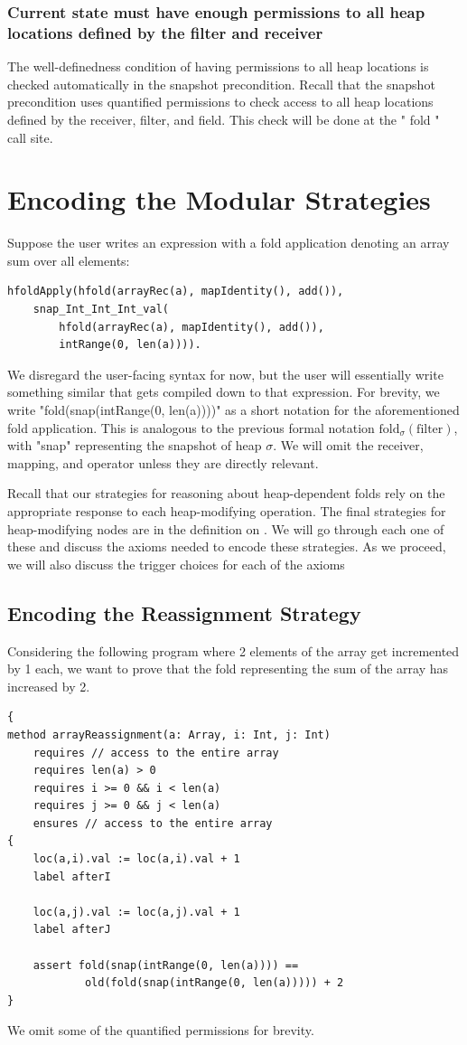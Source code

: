 \documentclass[msc,oneside]{ubcthesis}
\theoremstyle{definition}
\begin{document}
\subsubsection{Current state must have enough permissions to all heap locations defined by the filter and receiver}
The well-definedness condition of having permissions to all heap locations is checked automatically in the snapshot precondition. Recall that the snapshot precondition uses quantified permissions to check access to all heap locations defined by the receiver, filter, and field. This check will be done at the " fold " call site.

\section{Encoding the Modular Strategies}
Suppose the user writes an expression with a fold application denoting an array sum over all elements: 
\begin{lstlisting}
hfoldApply(hfold(arrayRec(a), mapIdentity(), add()),
    snap_Int_Int_Int_val(
        hfold(arrayRec(a), mapIdentity(), add()), 
        intRange(0, len(a)))).
\end{lstlisting}
We disregard the user-facing syntax for now, but the user will essentially write something similar that gets compiled down to that expression. For brevity, we write "fold(snap(intRange(0, len(a))))" as a short notation for the aforementioned fold application. This is analogous to the previous formal notation $\textrm{fold}_\sigma(\textrm{filter})$, with "snap" representing the snapshot of heap $\sigma$.  We will omit the receiver, mapping, and operator unless they are directly relevant. 

Recall that our strategies for reasoning about heap-dependent folds rely on the appropriate response to each heap-modifying operation. The final strategies for heap-modifying nodes are in the definition on .
We will go through each one of these and discuss the axioms needed to encode these strategies. As we proceed, we will also discuss the trigger choices for each of the axioms

\subsection{Encoding the Reassignment Strategy}
Considering the following program where 2 elements of the array get incremented by 1 each, we want to prove that the fold representing the sum of the array has increased by 2.
\begin{lstlisting}
{
method arrayReassignment(a: Array, i: Int, j: Int) 
    requires // access to the entire array
    requires len(a) > 0
    requires i >= 0 && i < len(a)
    requires j >= 0 && j < len(a)
    ensures // access to the entire array
{
    loc(a,i).val := loc(a,i).val + 1
    label afterI

    loc(a,j).val := loc(a,j).val + 1
    label afterJ    
    
    assert fold(snap(intRange(0, len(a)))) == 
            old(fold(snap(intRange(0, len(a))))) + 2
}
\end{lstlisting}
We omit some of the quantified permissions for brevity.
\end{document}
